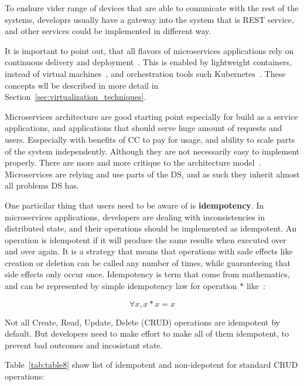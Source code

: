  To enshure vider range of devices that are able to comunicate with the rest of the systems, developrs usually have a gateway into the system that is REST service, and other services could be implemented in different way.

It is important to point out, that all flavors of microservices applications rely on continuous delivery and deployment~\cite{7436659}. This is enabled by lightweight containers, instead of virtual machines~\cite{FelterFRR15}, and orchestration tools such Kubernetes~\cite{BurnsGOBW16}. These concepts wll be described in more detail in Section~\ref{sec:virtualization_techniques}.

Microservices architecture are good starting point especially for build as a service applications, and applications that should serve huge amount of requests and users. Esspecially with benefits of CC to pay for usage, and ability to scale parts of the system independently.  Although they are not necessarily easy to implement properly. There are more and more critique to the architecture model~\cite{SoldaniTH18}. Microservices are relying and use parts of the DS, and as such they inherit almost all problems DS has. 

One particilar thing that users need to be aware of is \textbf{idempotency}. In microservices applications, developers are dealing with inconsistencies in distributed state, and their operations should be implemented as idempotent. An operation is idempotent if it will produce the same results when executed over and over again. It is a strategy that means that operations with sade effects like creation or deletion can be called any number of times, while guaranteeing that side effects only occur once. Idempotency is term that come from mathematics, and can be represented by simple idempotency law for operation $*$ like~\cite{gratzer2002general}:

\begin{equation}\label{form:idempotency_law}
	\forall x, x * x = x
\end{equation}

Not all Create, Read, Update, Delete (CRUD) operations are idempotent by default. But developers need to make effort to make all of them idempotent, to prevent bad outcomes and incosistant state. 

Table~\ref{tab:table8} show list of idempotent and non-idepotent for standard CRUD operations:

